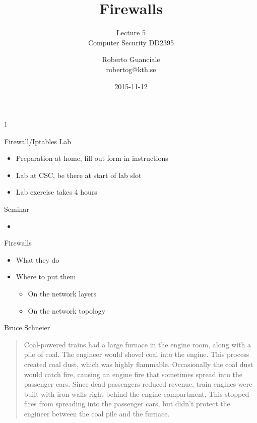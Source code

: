 1\documentclass{beamer}
\title{Firewalls}
\subtitle{Lecture 5 \\ Computer Security DD2395}
\author[R. Guanciale]{
  Roberto Guanciale\\
  robertog@kth.se
}
\date{2015-11-12}
\begin{document}
\begin{frame}[plain]
  \titlepage
\end{frame}

\begin{frame}{Firewall/Iptables Lab}
  \begin{itemize}
  \item Preparation at home, fill out form in instructions 
  \item Lab at CSC, be there at start of lab slot 
  \item Lab exercise takes 4 hours
  \end{itemize}
\end{frame}

\begin{frame}{Seminar}
  \begin{itemize}
  \item 
  \end{itemize}
\end{frame}


\begin{frame}{Firewalls}
  \begin{itemize}
  \item What they do 
  \item Where to put them 
    \begin{itemize}
    \item On the network layers 
    \item On the network topology
    \end{itemize}
  \end{itemize}
\end{frame}

\begin{frame}{Bruce Schneier}
  
  \begin{quote}
Coal-powered trains had a large furnace in the 
engine room, along with a pile of coal. The 
engineer would shovel coal into the engine. 
This process created coal dust, which was 
highly flammable. Occasionally the coal dust 
would catch fire, causing an engine fire that 
sometimes spread into the passenger cars. 
Since dead passengers reduced revenue, train 
engines were built with iron walls right behind 
the engine compartment. This stopped fires 
from spreading into the passenger cars, but 
didn't protect the engineer between the coal pile 
and the furnace.
  \end{quote}
\end{frame}

\end{document}

